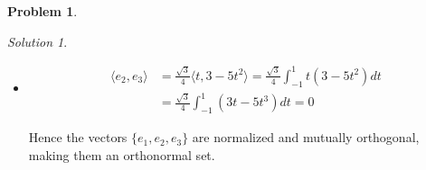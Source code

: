 \documentclass[12pt,a4paper]{article}
\theoremstyle{definition}
\newtheorem{problem}{Problem}
\theoremstyle{remark}
\newtheorem*{solution}{Solution}
\begin{document}
\begin{problem}
\begin{enumerate}
\begin{solution}
\begin{enumerate}
\begin{itemize}
                    \item \begin{align*}
                        \langle e_2, e_3 \rangle &= \frac{\sqrt{3}}{4} \langle t, 3-5t^2 \rangle = \frac{\sqrt{3}}{4} \int_{-1}^1 t(3-5t^2) dt \\
                        &= \frac{\sqrt{3}}{4} \int_{-1}^1 \left( 3t - 5t^3 \right) dt = 0
                    \end{align*}

                    Hence the vectors $\{e_1,e_2,e_3\}$ are normalized and mutually orthogonal, making them an orthonormal set.
                \end{itemize}
            \end{enumerate}
        \end{solution}
    \end{enumerate}
\end{problem}
\end{document}
